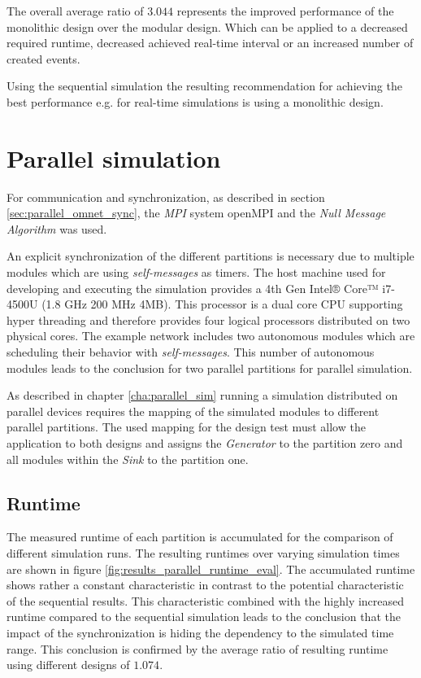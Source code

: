 The overall average ratio of $3.044$ represents the improved performance of the monolithic design over the modular design.
Which can be applied to a decreased required runtime, decreased achieved real-time interval or an increased number of created events.

Using the sequential simulation the resulting recommendation for achieving the best performance e.g. for real-time simulations is using a monolithic design.

\section{Parallel simulation}
\label{sec:measurements_parallel}
For communication and synchronization, as described in section \ref{sec:parallel_omnet_sync}, the \emph{MPI} system openMPI and the \emph{Null Message Algorithm} was used.

An explicit synchronization of the different partitions is necessary due to multiple modules which are using \emph{self-messages} as timers.
The host machine used for developing and executing the simulation provides a 4th Gen Intel® Core™ i7-4500U (1.8 GHz 200 MHz 4MB).
This processor is a dual core CPU supporting hyper threading and therefore provides four logical processors distributed on two physical cores.
The example network includes two autonomous modules which are scheduling their behavior with \emph{self-messages}.
This number of autonomous modules leads to the conclusion for two parallel partitions for parallel simulation.

As described in chapter \ref{cha:parallel_sim} running a simulation distributed on parallel devices requires the mapping of the simulated modules to different parallel partitions.
The used mapping for the design test must allow the application to both designs and assigns the \emph{Generator} to the partition zero and all modules within the \emph{Sink} to the partition one.

\subsection{Runtime}
\label{sec:measurements_parallel_runtime}

The measured runtime of each partition is accumulated for the comparison of different simulation runs.
The resulting runtimes over varying simulation times are shown in figure \ref{fig:results_parallel_runtime_eval}.
The accumulated runtime shows rather a constant characteristic in contrast to the potential characteristic of the sequential results.
This characteristic combined with the highly increased runtime compared to the sequential simulation leads to the conclusion that the impact of the synchronization is hiding the dependency to the simulated time range.
This conclusion is confirmed by the average ratio of resulting runtime using different designs of $1.074$.
\\

